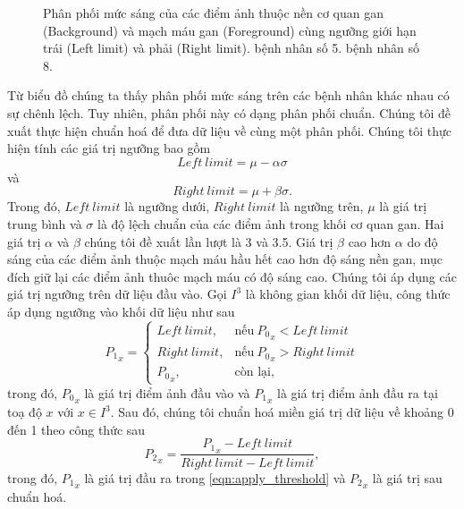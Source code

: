 \begin{figure}[h!]
\begin{subfigure}[b]{.8\textwidth}
			\caption{}
			\label{fig:pre_processing_histogram_8}
		\end{subfigure}
		\caption[Phân phối mức sáng của các điểm ảnh thuộc nền cơ quan gan và mạch máu gan cùng ngưỡng giới hạn trái và phải.]{Phân phối mức sáng của các điểm ảnh thuộc nền cơ quan gan (Background) và mạch máu gan (Foreground) cùng ngưỡng giới hạn trái (Left limit) và phải (Right limit).  bệnh nhân số 5.  bệnh nhân số 8.}
		\label{fig:pre_processing_histogram}
	\end{figure}	
	Từ biểu đồ chúng ta thấy phân phối mức sáng trên các bệnh nhân khác nhau có sự chênh lệch. Tuy nhiên, phân phối này có dạng phân phối chuẩn. Chúng tôi đề xuất thực hiện chuẩn hoá để đưa dữ liệu về cùng một phân phối. Chúng tôi thực hiện tính các giá trị ngưỡng bao gồm
	\begin{equation}
		Left\ limit = \mu - \alpha\sigma
		\label{eqn:left_threshold}
	\end{equation}
	và
	\begin{equation}
		Right\ limit = \mu + \beta\sigma.
		\label{eqn:right_threshold}
	\end{equation}
	Trong đó, $Left\ limit$ là ngưỡng dưới, $Right\ limit$ là ngưỡng trên, $\mu$ là giá trị trung bình và $\sigma$ là độ lệch chuẩn của các điểm ảnh trong khối cơ quan gan. Hai giá trị $\alpha$ và $\beta$ chúng tôi đề xuất lần lượt là 3 và 3.5. Giá trị $\beta$ cao hơn $\alpha$ do độ sáng của các điểm ảnh thuộc mạch máu hầu hết cao hơn độ sáng nền gan, mục đích giữ lại các điểm ảnh thuôc mạch máu có độ sáng cao. Chúng tôi áp dụng các giá trị ngưỡng trên dữ liệu đầu vào. Gọi $I^3$ là không gian khối dữ liệu, công thức áp dụng ngưỡng vào khối dữ liệu như sau
	\begin{equation}
		{P_1}_x=
		\begin{cases}
			Left\ limit, & \text{nếu}\ {P_0}_x < Left\ limit\\
			Right\ limit, & \text{nếu}\ {P_0}_x > Right\ limit\\
			{P_0}_x, & \text{còn lại},
		\end{cases}
		\label{eqn:apply_threshold}
	\end{equation} 
	trong đó, ${P_0}_x$ là giá trị điểm ảnh đầu vào và ${P_1}_x$ là giá trị điểm ảnh đầu ra tại toạ độ $x$ với $x\in I^3$. Sau đó, chúng tôi chuẩn hoá miền giá trị dữ liệu về khoảng 0 đến 1 theo công thức sau
	\begin{equation}
		{P_2}_x=\dfrac{{P_1}_x - Left\ limit}{Right\ limit - Left\ limit},
		\label{eqn:normalize_unit}
	\end{equation}
	trong đó, ${P_1}_x$ là giá trị đầu ra trong \autoref{eqn:apply_threshold} và ${P_2}_x$ là giá trị sau chuẩn hoá.

